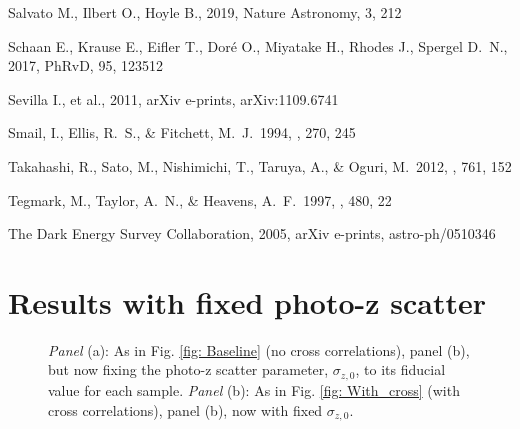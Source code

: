 \documentclass[a4paper,fleqn,usenatbib]{mnras}
\begin{document}
\begin{thebibliography}{99}
 Salvato M., Ilbert O., Hoyle B., 2019, Nature Astronomy, 3, 212 

 Schaan E., Krause E., Eifler T., Dor{\'e} O., Miyatake H., Rhodes J., Spergel D.~N., 2017, PhRvD, 95, 123512

 Sevilla I., et al., 2011, arXiv e-prints, arXiv:1109.6741


 Smail, I., Ellis, R.~S., \& Fitchett, M.~J.\ 1994, \mnras, 270, 245 

 Takahashi, R., Sato, M., Nishimichi, T., Taruya, A., \& Oguri, M.\ 2012, \apj, 761, 152 

 Tegmark, M., Taylor, A.~N., \& Heavens, A.~F.\ 1997, \apj, 480, 22 

 The Dark Energy Survey Collaboration, 2005, arXiv e-prints, astro-ph/0510346


\end{thebibliography}


\appendix




\section{Results with fixed photo-z scatter}
\label{sec: shift_and_Gaussian}

\begin{figure*}
\centering
{}
\caption{{\textit{Panel} (a)}: As in Fig. \ref{fig: Baseline} (no cross correlations), panel (b), but now fixing the photo-z scatter parameter, $\sigma_{z,0}$, to its fiducial value for each sample. {\textit{Panel}} (b): As in Fig. \ref{fig: With_cross} (with cross correlations), panel (b), now with fixed $\sigma_{z,0}$.}
\label{fig: Fixed_phot_z}
\end{figure*}
\end{document}
